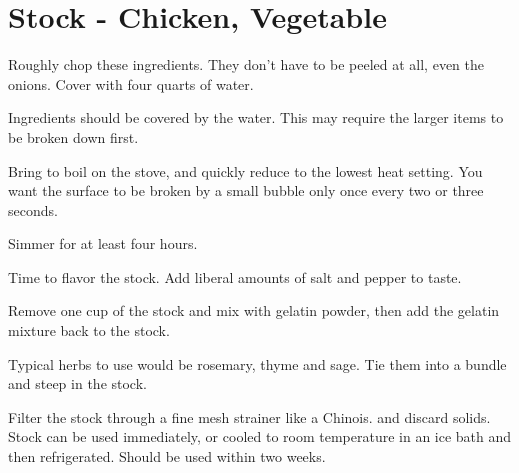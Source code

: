 \section{Stock - Chicken, Vegetable}
\begin{recipe}



Roughly chop these ingredients. They don't have to be peeled at all, even the onions. Cover with four quarts of water.


Ingredients should be covered by the water. This may require the larger items to be broken down first.

Bring to boil on the stove, and quickly reduce to the lowest heat setting. You want the surface to be broken by a small bubble only once every two or three seconds.

Simmer for at least four hours.


Time to flavor the stock. Add liberal amounts of salt and pepper to taste.


Remove one cup of the stock and mix with gelatin powder, then add the gelatin mixture back to the stock.

Typical herbs to use would be rosemary, thyme and sage. Tie them into a bundle and steep in the stock.

Filter the stock through a fine mesh strainer like a Chinois. and discard solids.
Stock can be used immediately, or cooled to room temperature in an ice bath and then refrigerated. Should be used within two weeks.

\end{recipe}
